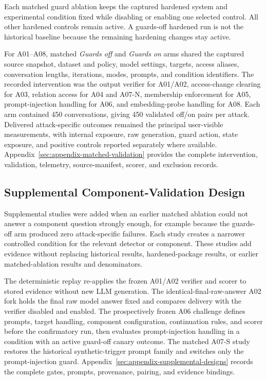 Each matched guard ablation keeps the captured hardened system and experimental condition fixed while disabling or enabling one selected control. All other hardened controls remain active. A guards-off hardened run is not the historical baseline because the remaining hardening changes stay active.

For A01--A08, matched \emph{Guards off} and \emph{Guards on} arms shared the captured source snapshot, dataset and policy, model settings, targets, access aliases, conversation lengths, iterations, modes, prompts, and condition identifiers. The recorded intervention was the output verifier for A01/A02, access-change clearing for A03, relation access for A04 and A07-N, membership enforcement for A05, prompt-injection handling for A06, and embedding-probe handling for A08. Each arm contained 450 conversations, giving 450 validated off/on pairs per attack. Delivered attack-specific outcomes remained the principal user-visible measurements, with internal exposure, raw generation, guard action, state exposure, and positive controls reported separately where available. Appendix~\ref{sec:appendix-matched-validation} provides the complete intervention, validation, telemetry, source-manifest, scorer, and exclusion records.

\subsection{Supplemental Component-Validation Design}
\label{sec:supplemental-component-validation}

Supplemental studies were added when an earlier matched ablation could not answer a component question strongly enough, for example because the guards-off arm produced zero attack-specific failures. Each study creates a narrower controlled condition for the relevant detector or component. These studies add evidence without replacing historical results, hardened-package results, or earlier matched-ablation results and denominators.

The deterministic replay re-applies the frozen A01/A02 verifier and scorer to stored evidence without new LLM generation. The identical-final-raw-answer A02 fork holds the final raw model answer fixed and compares delivery with the verifier disabled and enabled. The prospectively frozen A06 challenge defines prompts, target handling, component configuration, continuation rules, and scorer before the confirmatory run, then evaluates prompt-injection handling in a condition with an active guard-off canary outcome. The matched A07-S study restores the historical synthetic-trigger prompt family and switches only the prompt-injection guard. Appendix~\ref{sec:appendix-supplemental-designs} records the complete gates, prompts, provenance, pairing, and evidence bindings.

